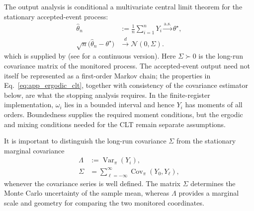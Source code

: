 \documentclass[showpacs,amsmath,amssymb,twocolumn,prx,superscriptaddress,10pt,aps,nofootinbib]{revtex4-2}
\begin{document}
The output analysis is conditional a multivariate central limit
theorem for the stationary accepted-event process:
\begin{equation}
\label{eq:app_ergodic_clt}
\begin{aligned}
    \widehat\theta_n
    &:={}
    \frac{1}{n}\sum_{i=1}^{n}Y_i
    \xrightarrow{\mathrm{a.s.}}
    \theta^\star,\\
    \sqrt n\bigl(\widehat\theta_n-\theta^\star\bigr)
    &\xrightarrow{d}
    \mathcal N(0,\Sigma).
\end{aligned}
\end{equation}
which is supplied by \cite{attal2015central} (see \cite{bringuier2017central} for a continuous version). Here $\Sigma\succ0$ is the long-run covariance matrix of the monitored process. The accepted-event output need not itself be represented as a first-order Markov chain; the properties in Eq.~\eqref{eq:app_ergodic_clt}, together with consistency of the covariance estimator below, are what the stopping analysis requires. In the finite-register implementation, $\omega_i$ lies in a bounded interval and hence $Y_i$ has moments of all orders. Boundedness supplies the required moment conditions, but the ergodic and mixing conditions needed for the CLT remain separate assumptions.

It is important to distinguish the long-run covariance $\Sigma$ from the stationary marginal covariance
\begin{equation}
\label{eq:app_sigma_lambda_distinction}
\begin{aligned}
    \Lambda
    &:={}
    \operatorname{Var}_\pi(Y_i),\\
    \Sigma
    &=
    \sum_{\ell=-\infty}^{\infty}
    \operatorname{Cov}_\pi(Y_0,Y_\ell),
\end{aligned}
\end{equation}
whenever the covariance series is well defined. The matrix $\Sigma$ determines the Monte Carlo uncertainty of the sample mean, whereas $\Lambda$ provides a marginal scale and geometry for comparing the two monitored coordinates.
\end{document}
